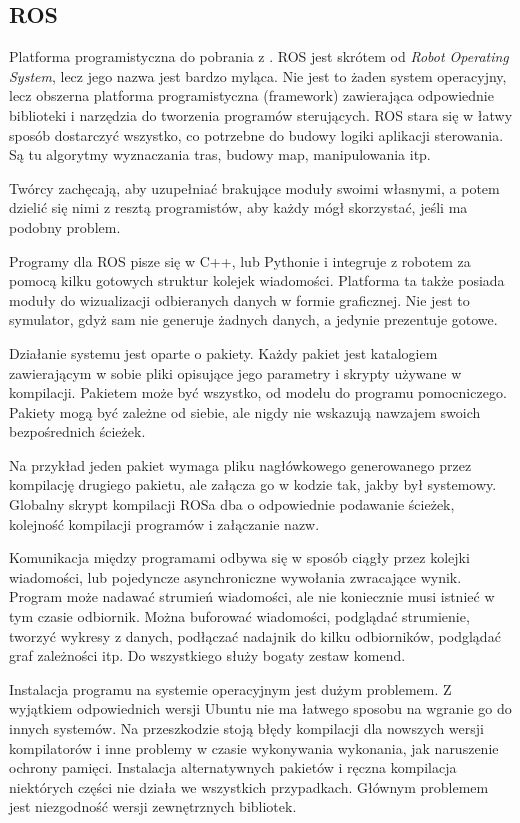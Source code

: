 \subsection{ROS}
Platforma programistyczna do pobrania z \cite{ros_website}.
ROS jest skrótem od \emph{Robot Operating System}, lecz jego nazwa jest bardzo myląca.
Nie jest to żaden system operacyjny, lecz obszerna platforma programistyczna (framework) zawierająca odpowiednie biblioteki i narzędzia do tworzenia programów sterujących.
ROS stara się w łatwy sposób dostarczyć wszystko, co potrzebne do budowy logiki aplikacji sterowania.
Są tu algorytmy wyznaczania tras, budowy map, manipulowania itp. 

Twórcy zachęcają, aby uzupełniać brakujące moduły swoimi własnymi, a potem dzielić się nimi z resztą programistów, aby każdy mógł skorzystać, jeśli ma podobny problem.

Programy dla ROS pisze się w C++, lub Pythonie i integruje z robotem za pomocą kilku gotowych struktur kolejek wiadomości.
Platforma ta także posiada moduły do wizualizacji odbieranych danych w formie graficznej.
Nie jest to symulator, gdyż sam nie generuje żadnych danych, a jedynie prezentuje gotowe.

Działanie systemu jest oparte o pakiety. Każdy pakiet jest katalogiem zawierającym w sobie pliki opisujące jego parametry i skrypty używane w kompilacji.
Pakietem może być wszystko, od modelu do programu pomocniczego.
Pakiety mogą być zależne od siebie, ale nigdy nie wskazują nawzajem swoich bezpośrednich ścieżek.

Na przykład jeden pakiet wymaga pliku nagłówkowego generowanego przez kompilację drugiego pakietu, ale załącza go w kodzie tak, jakby był systemowy.
Globalny skrypt kompilacji ROSa dba o odpowiednie podawanie ścieżek, kolejność kompilacji programów i załączanie nazw.

Komunikacja między programami odbywa się w sposób ciągły przez kolejki wiadomości, lub pojedyncze asynchroniczne wywołania zwracające wynik.
Program może nadawać strumień wiadomości, ale nie koniecznie musi istnieć w tym czasie odbiornik.
Można buforować wiadomości, podglądać strumienie, tworzyć wykresy z danych, podłączać nadajnik do kilku odbiorników, podglądać graf zależności itp.
Do wszystkiego służy bogaty zestaw komend.

Instalacja programu na systemie operacyjnym jest dużym problemem.
Z wyjątkiem odpowiednich wersji Ubuntu nie ma łatwego sposobu na wgranie go do innych systemów.
Na przeszkodzie stoją błędy kompilacji dla nowszych wersji kompilatorów i inne problemy w czasie wykonywania wykonania, jak naruszenie ochrony pamięci. 
Instalacja alternatywnych pakietów i ręczna kompilacja niektórych części nie działa we wszystkich przypadkach.
Głównym problemem jest niezgodność wersji zewnętrznych bibliotek.

